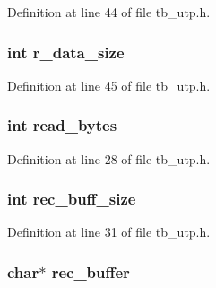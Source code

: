 Definition at line 44 of file tb\-\_\-utp.\-h.

\hypertarget{structtb__utp__t_a53fb5c97e533c0555ca3ed99facdb1d5}{
\subsubsection[{r\-\_\-data\-\_\-size}]{\setlength{\rightskip}{0pt plus 5cm}int r\-\_\-data\-\_\-size}}\label{structtb__utp__t_a53fb5c97e533c0555ca3ed99facdb1d5}


Definition at line 45 of file tb\-\_\-utp.\-h.

\hypertarget{structtb__utp__t_aeb56438a9cac1febce2dcddd6c404759}{
\subsubsection[{read\-\_\-bytes}]{\setlength{\rightskip}{0pt plus 5cm}int read\-\_\-bytes}}\label{structtb__utp__t_aeb56438a9cac1febce2dcddd6c404759}


Definition at line 28 of file tb\-\_\-utp.\-h.

\hypertarget{structtb__utp__t_a57c1edf513c216e498e37e3428180480}{
\subsubsection[{rec\-\_\-buff\-\_\-size}]{\setlength{\rightskip}{0pt plus 5cm}int rec\-\_\-buff\-\_\-size}}\label{structtb__utp__t_a57c1edf513c216e498e37e3428180480}


Definition at line 31 of file tb\-\_\-utp.\-h.

\hypertarget{structtb__utp__t_a2e6fac18f9532108c2aa44a52d3c6d67}{
\subsubsection[{rec\-\_\-buffer}]{\setlength{\rightskip}{0pt plus 5cm}char$\ast$ rec\-\_\-buffer}}\label{structtb__utp__t_a2e6fac18f9532108c2aa44a52d3c6d67}


